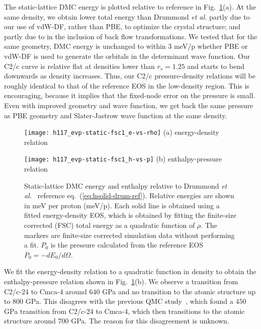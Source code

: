 The static-lattice DMC energy is plotted relative to reference in Fig.~\ref{fig:static-qmc-vs-drummond}(a). At the same density, we obtain lower total energy than Drummond \textit{et al.} partly due to our use of vdW-DF, rather than  PBE, to optimize the crystal structure; and partly due to in the inclusion of back flow transformations. We tested that for the same geometry, DMC energy is unchanged to within 3 meV/p whether PBE or vdW-DF is used to generate the orbitals in the determinant wave function.
Our C2/c curve is relative flat at densities lower than $r_s=1.25$ and starts to bend downwards as density increases.
Thus, our C2/c pressure-density relations will be roughly identical to that of the reference EOS in the low-density region.
This is encouraging, because it implies that the fixed-node error on the pressure is small.
Even with improved geometry and wave function, we get back the same pressure as PBE geometry and Slater-Jastrow wave function at the same density.

\begin{figure}[h]
\begin{minipage}{0.49\textwidth}
\centering
\texttt{[image: h117\_evp-static-fsc1\_e-vs-rho]}
(a) energy-density relation
\end{minipage}
\begin{minipage}{0.49\textwidth}
\centering
\texttt{[image: h117\_evp-static-fsc1\_h-vs-p]}
(b) enthalpy-pressure relation
\end{minipage}
\caption{Static-lattice DMC energy and enthalpy relative to Drummond \textit{et al.}~\cite{Drummond2015} reference eq.~(\ref{eq:hsolid-drum-ref}). Relative energies are shown in meV per proton (meV/p). Each solid line is obtained using a fitted energy-density EOS, which is obtained by fitting the finite-size corrected (FSC) total energy as a quadratic function of $\rho$. The markers are finite-size corrected simulation data without performing a fit. $P_0$ is the pressure calculated from the reference EOS $P_0=-dE_0/d\Omega$. \label{fig:static-qmc-vs-drummond}}
\end{figure}

We fit the energy-density relation to a quadratic function in density to obtain the enthalpy-pressure relation shown in Fig.~\ref{fig:static-qmc-vs-drummond}(b). We observe a transition from C2/c-24 to Cmca-4 around $640$ GPa and no transition to the atomic structure up to $800$ GPa.
This disagrees with the previous QMC study~\cite{McMinis2015}, which found a $450$ GPa transition from C2/c-24 to Cmca-4, which then transitions to the atomic structure around $700$ GPa.
The reason for this disagreement is unknown.

